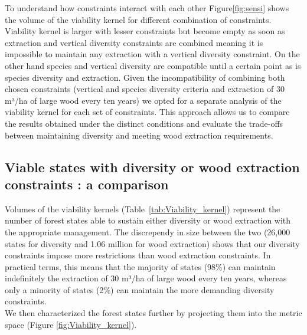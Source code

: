\documentclass{article}
\begin{document}
To understand how constraints interact with each other Figure\ref{fig:sensi} shows the volume of the viability kernel for different combination of constraints. Viability kernel is larger with lesser constraints but become empty as soon as extraction and vertical diversity constraints are combined meaning it is impossible to maintain any extraction with a vertical diversity constraint. On the other hand species and vertical diversity are compatible until a certain point as is species diversity and extraction. Given the incompatibility of combining both chosen constraints (vertical and species diversity criteria and extraction of 30 m³/ha of large wood every ten years) we opted for a separate analysis of the viability kernel for each set of constraints. This approach allows us to compare the results obtained under the distinct conditions and evaluate the trade-offs between maintaining diversity and meeting wood extraction requirements.

\subsection{Viable states with diversity or wood extraction constraints : a comparison}

Volumes of the viability kernels (Table~\ref{tab:Viability_kernel}) represent the number of forest states able to sustain either diversity or wood extraction with the appropriate management. The discrependy in size between the two (26,000 states for diversity and 1.06 million for wood extraction) shows that our diversity constraints impose more restrictions than wood extraction constraints. In practical terms, this means that the majority of states (98\%) can maintain indefinitely the extraction of 30 m³/ha of large wood every ten years, whereas only a minority of states (2\%) can maintain the more demanding diversity constraints. \\
We then characterized the forest states further by projecting them into the metric space (Figure \ref{fig:Viability_kernel}). 
\end{document}
